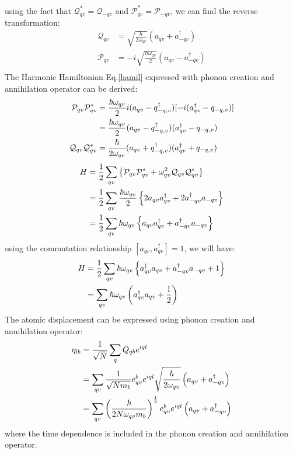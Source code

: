 \documentclass{article}
\begin{document}
using the fact that $\mathcal{Q}^*_{qv} = \mathcal{Q}_{-qv}$ and $\mathcal{P}^*_{qv} = \mathcal{P}_{-qv}$, we can find the reverse transformation:
\begin{align}
    \mathcal{Q}_{qv} &= \sqrt{\frac{\hbar}{2\omega_{qv}}} \left( a_{qv} + a^{\dagger}_{-qv} \right) \\
    \mathcal{P}_{qv} &= -i \sqrt{\frac{\hbar\omega_{qv}}{2}} \left( a_{qv} - a^{\dagger}_{-qv} \right) \\
\end{align}
The Harmonic Hamiltonian Eq.\ref{hamil} expressed with phonon creation and annihilation operator can be derived:
\begin{align}
    \mathcal{P}_{qv} \mathcal{P}^*_{qv} &= \frac{\hbar \omega_{qv}}{2} i (a_{qv}-q^{\dagger}_{-q,v})[-i(a^{\dagger}_{qv}-q_{-q,v})] \notag \\
        &= \frac{\hbar \omega_{qv}}{2} (a_{qv}-q^{\dagger}_{-q,v})(a^{\dagger}_{qv}-q_{-q,v}) \\
    \mathcal{Q}_{qv} \mathcal{Q}^*_{qv} &= \frac{\hbar}{2\omega_{qv}} (a_{qv}+q^{\dagger}_{-q,v})(a^{\dagger}_{qv}+q_{-q,v})
\end{align}
\begin{align}
    H &= \frac{1}{2} \sum_{qv} \left\{ \mathcal{P}_{qv} \mathcal{P}^*_{qv} + \omega^2_{qv} \mathcal{Q}_{qv} \mathcal{Q}^*_{qv} \right\} \notag \\
      &= \frac{1}{2} \sum_{qv} \frac{\hbar \omega_{qv}}{2} \left\{ 2a_{qv}a^{\dagger}_{qv} + 2a^{\dagger}_{-qv}a_{-qv} \right\} \notag \\
      &= \frac{1}{2} \sum_{qv} \hbar \omega_{qv} \left\{ a_{qv}a^{\dagger}_{qv} + a^{\dagger}_{-qv}a_{-qv} \right\}
\end{align}
using the commutation relationship $[a_{qv}, a^{\dagger}_{qv}] = 1$, we will have:
\begin{align}
    H &= \frac{1}{2} \sum_{qv} \hbar \omega_{qv} \left\{ a^{\dagger}_{qv}a_{qv} + a^{\dagger}_{-qv}a_{-qv} + 1 \right\} \notag \\
      &= \sum_{qv} \hbar \omega_{qv} \left(a^{\dagger}_{qv}a_{qv} + \frac{1}{2}\right)
\end{align}
The atomic displacement can be expressed using phonon creation and annihilation operator:
\begin{align}
    \eta_{lb} &= \frac{1}{\sqrt{N}} \sum_{q} Q_{qb} e^{iql} \notag \\
             &= \sum_{qv} \frac{1}{\sqrt{Nm_b}} e_{qv}^b e^{iql} \sqrt{\frac{\hbar}{2\omega_{qv}}} \left( a_{qv} + a^{\dagger}_{-qv} \right) \notag \\
             &= \sum_{qv} \left(\frac{\hbar}{2N\omega_{qv}m_b}\right)^{\frac{1}{2}} e_{qv}^b e^{iql} \left( a_{qv} + a^{\dagger}_{-qv} \right) \label{displacement}
\end{align}
where the time dependence is included in the phonon creation and annihilation operator.
\end{document}
